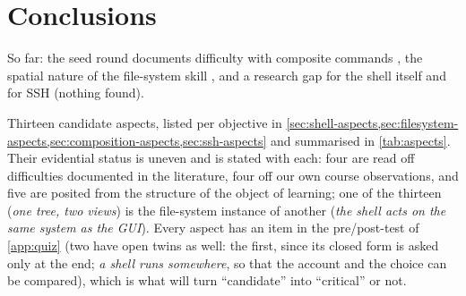 \mode*
\section{Conclusions}


\rqmisconceptions*
So far: the seed round documents difficulty with composite commands
\autocite{Doane1992UnixPrompts}, the spatial nature of the file-system
skill \autocite{Bergman2008Navigation,Benn2015BrainFolders}, and a
research gap for the shell itself \autocite{Winder2024ShellTutor} and for
SSH (nothing found).

\rqaspects*
Thirteen candidate aspects, listed per objective in
\cref{sec:shell-aspects,sec:filesystem-aspects,sec:composition-aspects,sec:ssh-aspects}
and summarised in \cref{tab:aspects}.
Their evidential status is uneven and is stated with each: four are read
off difficulties documented in the literature, four off our own course
observations, and five are posited from the structure of the object of
learning; one of the thirteen (\emph{one tree, two views}) is the
file-system instance of another (\emph{the shell acts on the same system
as the GUI}).
Every aspect has an item in the pre/post-test of \cref{app:quiz} (two
have open twins as well: the first, since its closed form is asked only
at the end; \emph{a shell runs somewhere}, so that the account and the
choice can be compared), which is what will turn \enquote{candidate} into
\enquote{critical} or not.

